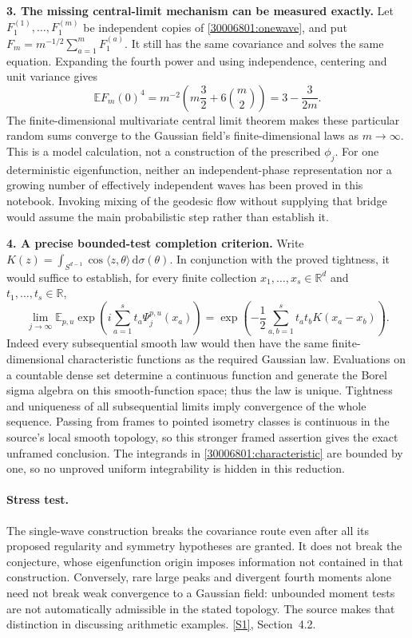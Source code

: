 \documentclass[11pt,a4paper]{article}
\newcommand{\R}{\mathbb{R}}
\newcommand{\E}{\mathbb{E}}
\newcommand{\dd}{\,\mathrm d}
\newcommand{\sref}[2]{\hyperlink{source:#1:#2}{[S#2]}}
\numberwithin{equation}{section}
\begin{document}
\textbf{3. The missing central-limit mechanism can be measured exactly.}
Let $F_1^{(1)},\ldots,F_1^{(m)}$ be independent copies of
\eqref{30006801:onewave}, and put $F_m=m^{-1/2}\sum_{a=1}^mF_1^{(a)}$.
It still has the same covariance and solves the same equation. Expanding
the fourth power and using independence, centering and unit variance gives
\[
 \E F_m(0)^4
 =m^{-2}\left(m\frac32+6\binom m2\right)
 =3-\frac{3}{2m}.
\]
The finite-dimensional multivariate central limit theorem makes these
particular random sums converge to the Gaussian field's finite-dimensional
laws as $m\to\infty$. This is a model calculation, not a construction of
the prescribed $\phi_j$. For one deterministic eigenfunction, neither an
independent-phase representation nor a growing number of effectively
independent waves has been proved in this notebook. Invoking mixing of
the geodesic flow without supplying that bridge would assume the main
probabilistic step rather than establish it.

\textbf{4. A precise bounded-test completion criterion.}
Write $K(z)=\int_{S^{d-1}}\cos\langle z,\theta\rangle\dd\sigma(\theta)$.
In conjunction with the proved tightness, it would suffice to establish,
for every finite collection $x_1,\ldots,x_s\in\R^d$ and
$t_1,\ldots,t_s\in\R$,
\begin{equation}\label{30006801:characteristic}
 \lim_{j\to\infty}\E_{p,u}
    \exp\left(i\sum_{a=1}^s t_a\Psi_j^{p,u}(x_a)\right)
 =\exp\left(-\frac12\sum_{a,b=1}^s t_at_bK(x_a-x_b)\right).
\end{equation}
Indeed every subsequential smooth law would then have the same
finite-dimensional characteristic functions as the required Gaussian law.
Evaluations on a countable dense set determine a continuous function and
generate the Borel sigma algebra on this smooth-function space; thus the
law is unique. Tightness and uniqueness of all subsequential limits imply
convergence of the whole sequence. Passing from frames to pointed
isometry classes is continuous in the source's local smooth topology,
so this stronger framed assertion gives the exact unframed conclusion.
The integrands in \eqref{30006801:characteristic} are bounded by one, so no
unproved uniform integrability is hidden in this reduction.

\paragraph{Stress test.}
The single-wave construction breaks the covariance route even after all
its proposed regularity and symmetry hypotheses are granted. It does not
break the conjecture, whose eigenfunction origin imposes information not
contained in that construction. Conversely, rare large peaks and divergent
fourth moments alone need not break weak convergence to a Gaussian field:
unbounded moment tests are not automatically admissible in the stated
topology. The source makes that distinction in discussing arithmetic
examples. \sref{30006801}{1}, Section~4.2.
\end{document}
